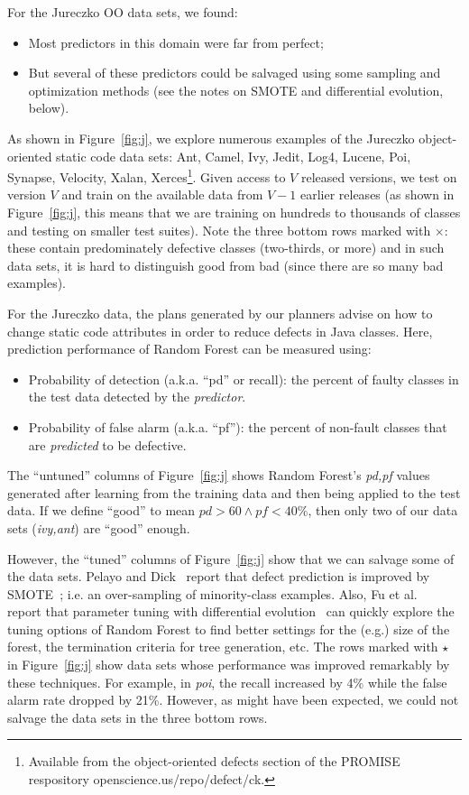 \documentclass{sig-alternate}
\newcommand{\bi}{\begin{itemize}[leftmargin=0.4cm]}
\newcommand{\ei}{\end{itemize}}
\newcommand{\fig}[1]{Figure~\ref{fig:#1}}
\begin{document}
For the Jureczko OO data sets, we found:
\bi
\item
Most predictors in this domain were far from perfect;
\item 
But several of these predictors could
be salvaged using some sampling and optimization methods (see the notes on SMOTE and differential evolution, below).
\ei
As shown in \fig{j}, we   explore numerous examples of the Jureczko   object-oriented static code data sets: Ant, Camel, Ivy, Jedit,   Log4, Lucene, Poi, Synapse, Velocity, Xalan, Xerces\footnote{Available from the object-oriented defects section of the PROMISE respository openscience.us/repo/defect/ck.}. 
Given access to $V$ released
versions, we test on version $V$ and train on the available data from $V-1$ earlier releases (as
shown in \fig{j}, this means that we are training on hundreds to thousands
of classes and testing on smaller test suites).
Note the three bottom rows marked with $\times$: these contain predominately
defective classes (two-thirds, or more) and in such data sets, it is hard to distinguish
good from bad (since there are so many bad examples). 

For the  Jureczko   data,
the plans generated by our planners advise on  how to change static code attributes in order to reduce defects in Java classes. Here, prediction performance of Random Forest can be measured using:
\bi
\item Probability of detection (a.k.a. ``pd'' or recall):  the percent of faulty classes in
the test data detected
by the {\em predictor}.
\item Probability of false alarm (a.k.a. ``pf''): the percent of non-fault
classes that are {\em predicted} to be defective.
\ei 

The ``untuned'' columns of \fig{j} shows Random Forest's {\em pd,pf}
values generated after learning from the training data and then being applied to the test data.
If we define ``good'' to mean $\mathit{pd}>60 \wedge \mathit{pf} < 40$\%,
then only two of our data sets ({\em ivy,ant}) are ``good'' enough. 

However, the ``tuned'' columns of \fig{j} show that we can salvage some of the data sets. Pelayo and Dick~\cite{pelayo07} report that defect prediction is improved by SMOTE~\cite{Chawla2002}; i.e. an over-sampling of minority-class examples. Also, Fu et al.~\cite{fu:fse16} report that parameter tuning with differential evolution~\cite{storn97} can quickly explore the tuning options of Random Forest to find better settings for the (e.g.) size of the forest, the termination criteria
for tree generation, etc. The rows marked with $\star$ in \fig{j} show data sets whose performance was improved remarkably by these techniques. For example, in {\em poi}, the recall increased by 4\% while the false alarm rate dropped by 21\%. However,  as might have been expected, we could not salvage the data sets in the  three bottom rows.
\end{document}
